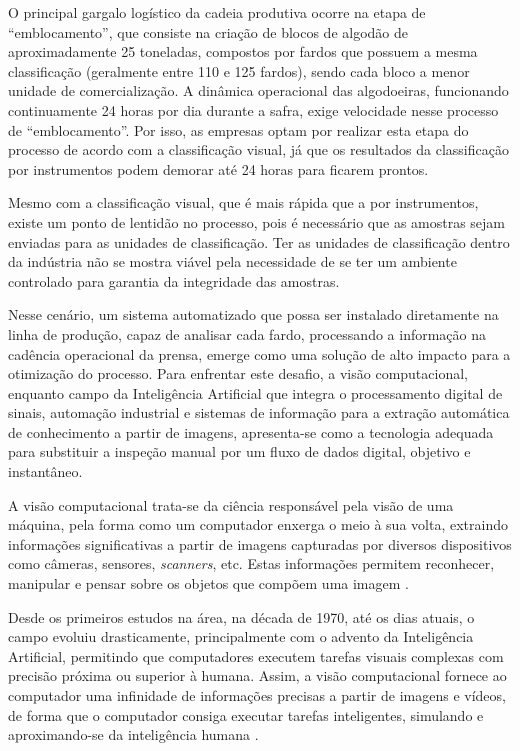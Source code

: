 O principal gargalo logístico da cadeia produtiva ocorre na etapa de ``emblocamento'', que consiste na criação de blocos de algodão de aproximadamente 25 toneladas, compostos por fardos que possuem a mesma classificação (geralmente entre 110 e 125 fardos), sendo cada bloco a menor unidade de comercialização. A dinâmica operacional das algodoeiras, funcionando continuamente 24 horas por dia durante a safra, exige velocidade nesse processo de ``emblocamento''. Por isso, as empresas optam por realizar esta etapa do processo de acordo com a classificação visual, já que os resultados da classificação por instrumentos podem demorar até 24 horas para ficarem prontos.

Mesmo com a classificação visual, que é mais rápida que a por instrumentos, existe um ponto de lentidão no processo, pois é necessário que as amostras sejam enviadas para as unidades de classificação. Ter as unidades de classificação dentro da indústria não se mostra viável pela necessidade de se ter um ambiente controlado para garantia da integridade das amostras. 


Nesse cenário, um sistema automatizado que possa ser instalado diretamente na linha de produção, capaz de analisar cada fardo, processando a informação na cadência operacional da prensa, emerge como uma solução de alto impacto para a otimização do processo. Para enfrentar este desafio, a visão computacional, enquanto campo da Inteligência Artificial que integra o processamento digital de sinais, automação industrial e sistemas de informação para a extração automática de conhecimento a partir de imagens, apresenta-se como a tecnologia adequada para substituir a inspeção manual por um fluxo de dados digital, objetivo e instantâneo.

A visão computacional trata-se da ciência responsável pela visão de uma máquina, pela forma como um computador enxerga o meio à sua volta, extraindo informações significativas a partir de imagens capturadas por diversos dispositivos como câmeras, sensores, \textit{scanners}, etc. Estas informações permitem reconhecer, manipular e pensar sobre os objetos que compõem uma imagem \cite{ballard1982computer}.

Desde os primeiros estudos na área, na década de 1970, até os dias atuais, o campo evoluiu drasticamente, principalmente com o advento da Inteligência Artificial, permitindo que computadores executem tarefas visuais complexas com precisão próxima ou superior à humana. Assim, a visão computacional fornece ao computador uma infinidade de informações precisas a partir de imagens e vídeos, de forma que o computador consiga executar tarefas inteligentes, simulando e aproximando-se da inteligência humana \cite{oliveira2024visao}.

